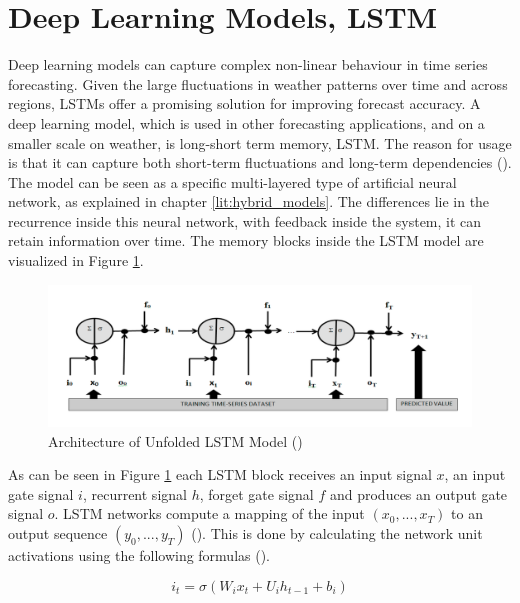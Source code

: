 \section{Deep Learning Models, LSTM}
\label{lit:LSTM_literature}
Deep learning models can capture complex non-linear behaviour in time series forecasting. Given the large fluctuations in weather patterns over time and across regions, LSTMs offer a promising solution for improving forecast accuracy. A deep learning model, which is used in other forecasting applications, and on a smaller scale on weather, is long-short term memory, LSTM. The reason for usage is that it can capture both short-term fluctuations and long-term dependencies (\cite{siami2019comparison}). The model can be seen as a specific multi-layered type of artificial neural network, as explained in chapter \ref{lit:hybrid_models}. The differences lie in the recurrence inside this neural network, with feedback inside the system, it can retain information over time. The memory blocks inside the LSTM model are visualized in Figure \ref{fig:LSTM}.

\begin{figure}[h!]
    \centering
    \includegraphics[width=1.0\linewidth]{images/LSTM.png}
    \caption{Architecture of Unfolded LSTM Model (\cite{salman2018single})}
    \label{fig:LSTM}
\end{figure}

\noindent As can be seen in Figure \ref{fig:LSTM} each LSTM block receives an input signal $x$, an input gate signal $i$, recurrent signal $h$, forget gate signal $f$ and produces an output gate signal $o$. LSTM networks compute a mapping of the input $(x_0,...,x_T)$ to an output sequence $(y_0,...,y_T)$ (\cite{salman2018single}). This is done by calculating the network unit activations using the following formulas (\cite{hochreiter1997long}). 

\begin{equation}
    i_t = \sigma(W_i x_t + U_i h_{t-1} + b_i)
    \label{eq:3}
\end{equation}


